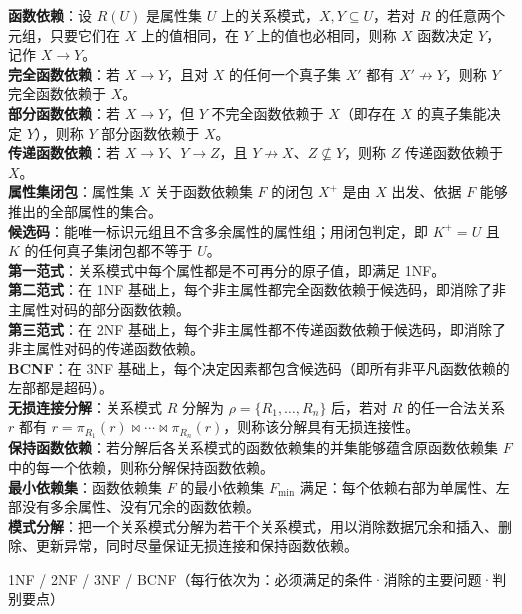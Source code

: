 \documentclass[a4paper,11pt]{article}
\begin{document}
\begin{keyterms}
\textbf{函数依赖}：设 $R(U)$ 是属性集 $U$ 上的关系模式，$X,Y\subseteq U$，若对 $R$ 的任意两个元组，只要它们在 $X$ 上的值相同，在 $Y$ 上的值也必相同，则称 $X$ 函数决定 $Y$，记作 $X\to Y$。\\
\textbf{完全函数依赖}：若 $X\to Y$，且对 $X$ 的任何一个真子集 $X'$ 都有 $X'\not\to Y$，则称 $Y$ 完全函数依赖于 $X$。\\
\textbf{部分函数依赖}：若 $X\to Y$，但 $Y$ 不完全函数依赖于 $X$（即存在 $X$ 的真子集能决定 $Y$），则称 $Y$ 部分函数依赖于 $X$。\\
\textbf{传递函数依赖}：若 $X\to Y$、$Y\to Z$，且 $Y\not\to X$、$Z\not\subseteq Y$，则称 $Z$ 传递函数依赖于 $X$。\\
\textbf{属性集闭包}：属性集 $X$ 关于函数依赖集 $F$ 的闭包 $X^{+}$ 是由 $X$ 出发、依据 $F$ 能够推出的全部属性的集合。\\
\textbf{候选码}：能唯一标识元组且不含多余属性的属性组；用闭包判定，即 $K^{+}=U$ 且 $K$ 的任何真子集闭包都不等于 $U$。\\
\textbf{第一范式}：关系模式中每个属性都是不可再分的原子值，即满足 1NF。\\
\textbf{第二范式}：在 1NF 基础上，每个非主属性都完全函数依赖于候选码，即消除了非主属性对码的部分函数依赖。\\
\textbf{第三范式}：在 2NF 基础上，每个非主属性都不传递函数依赖于候选码，即消除了非主属性对码的传递函数依赖。\\
\textbf{BCNF}：在 3NF 基础上，每个决定因素都包含候选码（即所有非平凡函数依赖的左部都是超码）。\\
\textbf{无损连接分解}：关系模式 $R$ 分解为 $\rho=\{R_1,\dots,R_n\}$ 后，若对 $R$ 的任一合法关系 $r$ 都有 $r=\pi_{R_1}(r)\bowtie\cdots\bowtie\pi_{R_n}(r)$，则称该分解具有无损连接性。\\
\textbf{保持函数依赖}：若分解后各关系模式的函数依赖集的并集能够蕴含原函数依赖集 $F$ 中的每一个依赖，则称分解保持函数依赖。\\
\textbf{最小依赖集}：函数依赖集 $F$ 的最小依赖集 $F_{\min}$ 满足：每个依赖右部为单属性、左部没有多余属性、没有冗余的函数依赖。\\
\textbf{模式分解}：把一个关系模式分解为若干个关系模式，用以消除数据冗余和插入、删除、更新异常，同时尽量保证无损连接和保持函数依赖。
\end{keyterms}

\begin{contrast}{1NF / 2NF / 3NF / BCNF（每行依次为：必须满足的条件·消除的主要问题·判别要点）}
\end{contrast}
\end{document}
